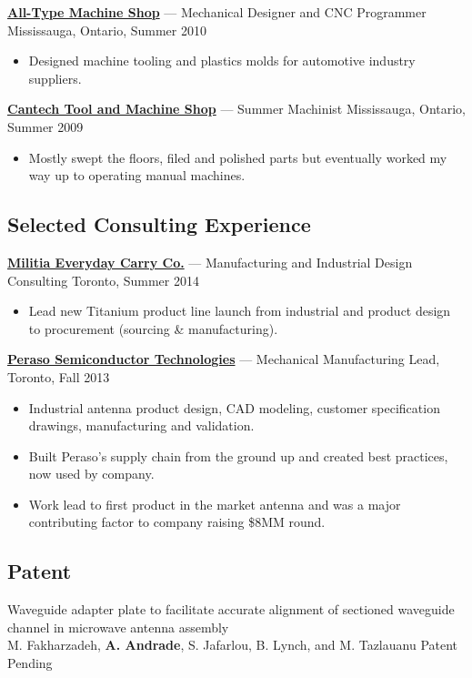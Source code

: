 \documentclass[pdftex,11pt,letterpaper]{article}
\begin{document}
\href{http://atmshop.ca/}{\textbf{All-Type Machine Shop}} --- Mechanical Designer and CNC Programmer \hfill {\color{gray} Mississauga, Ontario, Summer 2010}
\begin{itemize}
\item Designed machine tooling and plastics molds for automotive industry suppliers.
\end{itemize}

\href{http://www.manta.com/ic/mt6gc2l/ca/cantech-machine-tool-co-ltd}{\textbf{Cantech Tool and Machine Shop}} --- Summer Machinist \hfill {\color{gray} Mississauga, Ontario, Summer 2009}
\begin{itemize}
\item Mostly swept the floors, filed and polished parts but eventually worked my way up to operating manual machines. 
\end{itemize}
  
\subsection*{Selected Consulting Experience}

\href{http://www.haloculturecanada.com/collections/titanium-flash-edc}{\textbf{Militia Everyday Carry Co.}} --- Manufacturing and Industrial Design Consulting \hfill {\color{gray} Toronto, Summer 2014}
\begin{itemize}
  \item Lead new Titanium product line launch from industrial and product design to procurement (sourcing \& manufacturing).
\end{itemize}

\href{http://www.perasotech.com/}{\textbf{Peraso Semiconductor Technologies}} --- Mechanical Manufacturing Lead, \hfill {\color{gray} Toronto, Fall 2013}
\begin{itemize}
  \item Industrial antenna product design, CAD modeling, customer specification drawings, manufacturing and validation.
  \item Built Peraso’s supply chain from the ground up and created best practices, now used by company.
  \item Work lead to first product in the market antenna and was a major contributing factor to company raising \$8MM round.
\end{itemize}

\subsection*{Patent}
Waveguide adapter plate to facilitate accurate alignment of sectioned waveguide channel in microwave antenna assembly \color{gray} \\ {M. Fakharzadeh, \textbf{A. Andrade}, S. Jafarlou, B. Lynch, and M. Tazlauanu} \hfill {\color{gray} Patent Pending}
\color{black}
\end{document}
